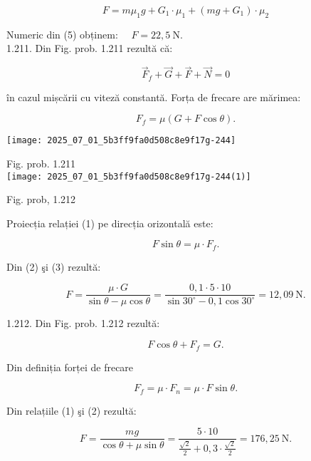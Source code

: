\begin{equation*}
F=m \mu_{1} g+G_{1} \cdot \mu_{1}+\left(m g+G_{1}\right) \cdot \mu_{2} \tag{5}
\end{equation*}


Numeric din (5) obținem: $\quad F=22,5 \mathrm{~N}$.\\
1.211. Din Fig. prob. 1.211 rezultă că:


\begin{equation*}
\vec{F}_{f}+\vec{G}+\vec{F}+\vec{N}=0 \tag{1}
\end{equation*}


în cazul mișcării cu viteză constantă. Forța de frecare are mărimea:


\begin{equation*}
F_{f}=\mu(G+F \cos \theta) . \tag{2}
\end{equation*}


\begin{center}
\texttt{[image: 2025\_07\_01\_5b3ff9fa0d508c8e9f17g-244]}
\end{center}

Fig. prob. 1.211\\
\texttt{[image: 2025\_07\_01\_5b3ff9fa0d508c8e9f17g-244(1)]}

Fig. prob, 1.212

Proiecția relației (1) pe direcția orizontală este:


\begin{equation*}
F \sin \theta=\mu \cdot F_{f} . \tag{3}
\end{equation*}


Din (2) şi (3) rezultă:

$$
F=\frac{\mu \cdot G}{\sin \theta-\mu \cos \theta}=\frac{0,1 \cdot 5 \cdot 10}{\sin 30^{\circ}-0,1 \cos 30^{\circ}}=12,09 \mathrm{~N} .
$$

1.212. Din Fig. prob. 1.212 rezultă:


\begin{equation*}
F \cos \theta+F_{f}=G . \tag{1}
\end{equation*}


Din definiția forței de frecare


\begin{equation*}
F_{f}=\mu \cdot F_{n}=\mu \cdot F \sin \theta . \tag{2}
\end{equation*}


Din relațiile (1) şi (2) rezultă:

$$
F=\frac{m g}{\cos \theta+\mu \sin \theta}=\frac{5 \cdot 10}{\frac{\sqrt{2}}{2}+0,3 \cdot \frac{\sqrt{2}}{2}}=176,25 \mathrm{~N} .
$$

